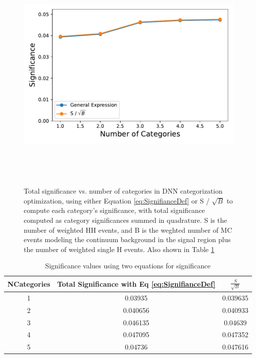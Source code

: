 \begin{figure}[H]
  \setlength{\unitlength}{1mm}
  \begin{center}
    \mbox{\includegraphics*[height=100mm]{Sections/HHWWgg/images/DNN/Categorization/SigVsNCats.pdf}
    }
  \end{center}
  \caption{Total significance vs. number of categories in DNN categorization optimization, using either Equation \ref{eq:SignifianceDef} or S / $\sqrt{B}$ to 
  compute each category's significance, with total significance computed as category significances summed in quadrature. S is the number of weighted HH events, 
  and B is the weghted number of MC events modeling the continuum background in the signal region plus the number of weighted single H events. Also shown in Table \ref{tab:SigVsNcats_table}}    
  \label{fig:SigVsNcats}
\end{figure}

\begin{table}[H]
  \begin{center}
    \begin{tabular}{c|c|c}
    NCategories & Total Significance with Eq \ref{eq:SignifianceDef} & $\frac{S}{\sqrt{B}}$ \\ \hline
    1 & 0.03935 & 0.039635  \\ 
    2 & 0.040656 & 0.040933  \\ 
    3 & 0.046135 & 0.04639  \\ 
    4 & 0.047095 & 0.047352  \\ 
    5 & 0.04736 & 0.047616  \\ 
    \end{tabular}
  \end{center}
\caption{
    Significance values using two equations for significance
}
\label{tab:SigVsNcats_table}
\end{table}

\clearpage